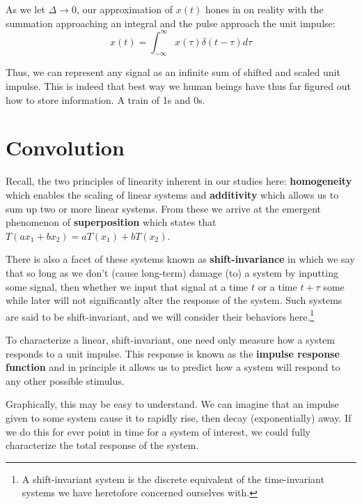 \documentclass[11pt]{book}
\begin{document}
As we let $\Delta\rightarrow 0$, our approximation of $x(t)$ hones in on reality with the summation approaching an integral and the pulse approach the unit impulse:
\begin{equation}
	x(t) = \int_{-\infty}^{\infty}x(\tau)\delta(t-\tau)d\tau
\end{equation}

Thus, we can represent any signal as an infinite sum of shifted and scaled unit impulse. This is indeed that best way we human beings have thus far figured out how to store information. A train of 1s and 0s.

\section{Convolution}
Recall, the two principles of linearity inherent in our studies here: \textbf{homogeneity} which enables the scaling of linear systems and \textbf{additivity} which allows us to sum up two or more linear systems. From these we arrive at the emergent phenomenon of \textbf{superposition} which states that $T(ax_1+bx_2)= aT(x_1) + bT(x_2)$.

There is also a facet of these systems known as \textbf{shift-invariance} in which we say that so long as we don't (cause long-term) damage (to) a system by inputting some signal, then whether we input that signal at a time $t$ or a time $t + \tau$ some while later will not significantly alter the response of the system. Such systems are said to be shift-invariant, and we will consider their behaviors here.\footnote{A shift-invariant system is the discrete equivalent of the time-invariant systems we have heretofore concerned ourselves with.}

To characterize a linear, shift-invariant, one need only measure how a system responds to a unit impulse. This response is known as the \textbf{impulse response function} and in principle it allows us to predict how a system will respond to any other possible stimulus. 

Graphically, this may be easy to understand. We can imagine that an impulse given to some system cause it to rapidly rise, then decay (exponentially) away. If we do this for ever point in time for a system of interest, we could fully characterize the total response of the system.
\end{document}
